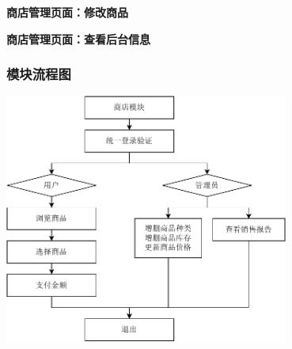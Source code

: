 \documentclass{article}
\begin{document}
\begin{center}
\textbf{商店管理页面：修改商品}
\end{center}

\begin{center}
\textbf{商店管理页面：查看后台信息}
\end{center}

\subsubsection{模块流程图}

\begin{center}
\includegraphics[width=0.7\textwidth]{fig/store-flowchart.pdf}
\end{center}
\end{document}
